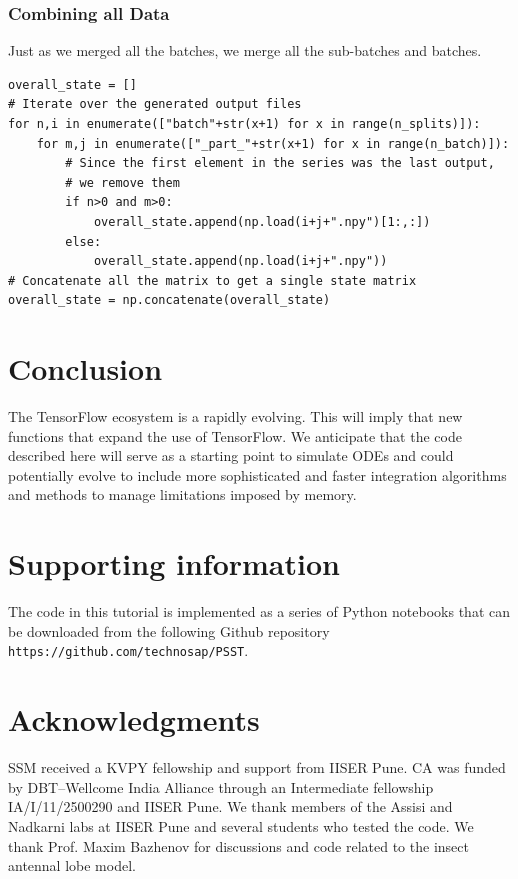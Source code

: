 \documentclass[10pt,letterpaper]{article}
\begin{document}
\subsubsection*{Combining all Data}
Just as we merged all the batches, we merge all the sub-batches and batches.

\begin{verbatim}
overall_state = []
# Iterate over the generated output files
for n,i in enumerate(["batch"+str(x+1) for x in range(n_splits)]):
    for m,j in enumerate(["_part_"+str(x+1) for x in range(n_batch)]):
        # Since the first element in the series was the last output, 
        # we remove them
        if n>0 and m>0:
            overall_state.append(np.load(i+j+".npy")[1:,:])
        else:
            overall_state.append(np.load(i+j+".npy"))
# Concatenate all the matrix to get a single state matrix
overall_state = np.concatenate(overall_state)
\end{verbatim}

\section*{Conclusion}
The TensorFlow ecosystem is a rapidly evolving. This will imply that new functions that expand the use of TensorFlow. We anticipate that the code described here will serve as a starting point to simulate ODEs and could potentially evolve to include more sophisticated and faster integration algorithms and methods to manage limitations imposed by memory. 

\section*{Supporting information}
The code in this tutorial is implemented as a series of Python notebooks that can be downloaded from the following Github repository \texttt{https://github.com/technosap/PSST}. 
\section*{Acknowledgments}
SSM received a KVPY fellowship and support from IISER Pune. CA was funded by DBT–Wellcome India Alliance through an Intermediate fellowship IA/I/11/2500290 and IISER Pune. We thank members of the Assisi and Nadkarni labs at IISER Pune and several students who tested the code.  We thank Prof. Maxim Bazhenov for discussions and code related to the insect antennal lobe model.

\nolinenumbers

\end{document}
